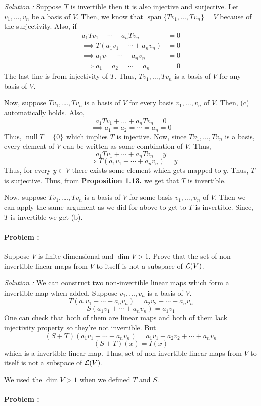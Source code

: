 \vspace{4mm}
\textit{Solution :} Suppose $T$ is invertible then it is also injective and surjective. Let $v_1, \ldots, v_n$ be a basis of $V$.
Then, we know that $\operatorname{span}\{Tv_1,\ldots,Tv_n\} = V$ because of the surjectivity. Also, if 
\begin{align*}
    a_1 Tv_1 + \cdots + a_n Tv_n &= 0 \\
    \implies T(a_1v_1 + \cdots + a_n v_n) &= 0 \\
    \implies a_1 v_1 + \cdots + a_n v_n &= 0 \\
    \implies a_1=a_2=\cdots=a_n&=0
\end{align*}
The last line is from injectivity of $T$. Thus, $Tv_1, \ldots, Tv_n$ is a basis of $V$ for any basis of $V$.

Now, suppose $Tv_1,\ldots,Tv_n$ is a basis of $V$ for every basis $v_1,\ldots,v_n$ of $V$. Then, (c) automatically holds. Also,
\[ a_1 Tv_1 + \ldots + a_n Tv_n = 0 \]
\[ \implies a_1 = a_2 = \cdots = a_n = 0 \]
Thus, $\operatorname{null} T = \{0\}$ which implies $T$ is injective. Now, since $Tv_1,\ldots,Tv_n$ is a basis, every element of $V$ can 
be written as some combination of $V$. Thus,
\[ a_1 Tv_1 + \cdots + a_n Tv_n = y \]
\[ \implies T(a_1 v_1 + \cdots + a_n v_n) = y \]
Thus, for every $y \in V$ there exists some element which gets mapped to $y$. Thus, $T$ is surjective. Thus, from \textbf{Proposition 1.13.}
we get that $T$ is invertible.

Now, suppose $Tv_1,\ldots,Tv_n$ is a basis of $V$ for some basis $v_1, \ldots,v_n$ of $V$. Then we can apply the same argument as we did 
for above to get to $T$ is invertible. Since, $T$ is invertible we get (b).

\paragraph{Problem :} Suppose $V$ is finite-dimensional and $\dim V > 1$. Prove that the set of non-invertible linear maps from $V$ to 
itself is not a subspace of $\operatorname{\mathcal{L}}(V)$.

\vspace{4mm}
\textit{Solution :} We can construct two non-invertible linear maps which form a invertible map when added.
Suppose $v_1, \ldots, v_n$ is a basis of $V$. 
\[ T(a_1 v_1 + \cdots + a_n v_n ) = a_2 v_2 + \cdots + a_n v_n \]
\[ S(a_1 v_1 + \cdots + a_n v_n ) = a_1 v_1 \]
One can check that both of them are linear maps and both of them lack injectivity property so they're not invertible.
But 
\[ (S+T)(a_1 v_1 + \cdots + a_n v_n ) = a_1 v_1 + a_2 v_2 + \cdots + a_n v_n \]
\[ (S+T)(x)=I(x) \]
which is a invertible linear map. Thus, set of non-invertible linear maps from $V$ to itself is not a subspace of $\operatorname{\mathcal{L}}(V)$.

\begin{remark}
    We used the $\dim V > 1$ when we defined $T$ and $S$.
\end{remark}

\paragraph{Problem :}